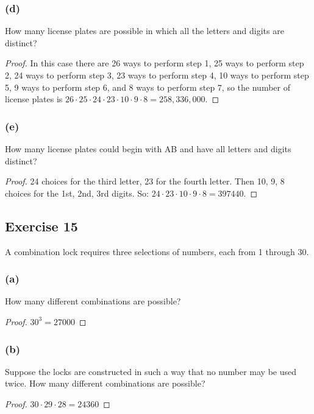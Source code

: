 \documentclass[14pt]{extarticle}
\begin{document}
\subsubsection{(d)}
How many license plates are possible in which all the letters and digits are distinct?

\begin{proof}
In this case there are 26 ways to perform step 1, 25 ways to perform step 2, 24 ways to perform step 3, 23 ways to 
perform step 4, 10 ways to perform step 5, 9 ways to perform step 6, and 8 ways to perform step 7, so the number 
of license plates is \(26 \cdot 25 \cdot 24 \cdot 23 \cdot 10 \cdot 9 \cdot 8 = 258,336,000\).
\end{proof}

\subsubsection{(e)}
How many license plates could begin with AB and have all letters and digits distinct?

\begin{proof}
24 choices for the third letter, 23 for the fourth letter. Then 10, 9, 8 choices for the 1st, 2nd, 3rd digits. So:
\(24 \cdot 23 \cdot 10 \cdot 9 \cdot 8 = 397440\).
\end{proof}

\subsection{Exercise 15}
A combination lock requires three selections of numbers, each from 1 through 30.

\subsubsection{(a)}
How many different combinations are possible?

\begin{proof}
\(30^3 = 27000\)
\end{proof}

\subsubsection{(b)}
Suppose the locks are constructed in such a way that no number may be used twice. How many different combinations 
are possible?

\begin{proof}
\(30 \cdot 29 \cdot 28 = 24360\)
\end{proof}
\end{document}
